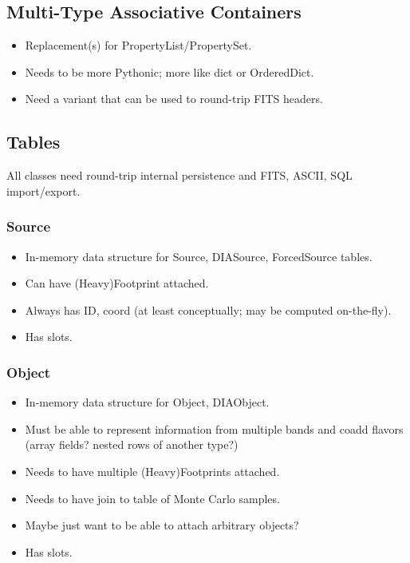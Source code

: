 \subsection{Multi-Type Associative Containers}
\label{sec:spAssociativeContainers}

\begin{itemize}
\item Replacement(s) for PropertyList/PropertySet.
\item Needs to be more Pythonic; more like dict or OrderedDict.
\item Need a variant that can be used to round-trip FITS headers.
\end{itemize}

\subsection{Tables}
\label{sec:spTables}

All classes need round-trip internal persistence and FITS, ASCII, SQL import/export.

\subsubsection{Source}
\label{sec:spTablesSource}

\begin{itemize}
\item In-memory data structure for Source, DIASource, ForcedSource tables.
\item Can have (Heavy)Footprint attached.
\item Always has ID, coord (at least conceptually; may be computed on-the-fly).
\item Has slots.
\end{itemize}

\subsubsection{Object}
\label{sec:spTablesObject}

\begin{itemize}
\item In-memory data structure for Object, DIAObject.
\item Must be able to represent information from multiple bands and coadd flavors (array fields? nested rows of another type?)
\item Needs to have multiple (Heavy)Footprints attached.
\item Needs to have join to table of Monte Carlo samples.
\item Maybe just want to be able to attach arbitrary objects?
\item Has slots.
\end{itemize}

